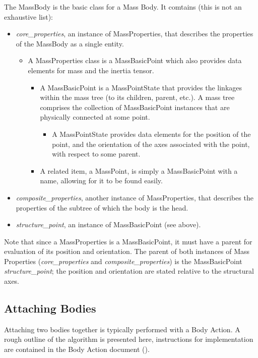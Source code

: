 The MassBody is the basic class for a Mass Body.  It comtains (this is not an 
exhaustive list):
\begin{itemize}
 \item \textit{core\_properties}, an instance of MassProperties, that 
 describes the properties of the MassBody as a single entity.
 \begin{itemize}
  \item A MassProperties class is a MassBasicPoint which also provides data 
  elements for mass and the inertia tensor.
  \begin{itemize}
   \item A MassBasicPoint is a MassPointState that provides the linkages 
   within the mass tree (to its children, parent, etc.).  A mass tree 
   comprises the collection of MassBasicPoint instances that are physically 
   connected at some point.
   \begin{itemize}
    \item A MassPointState provides data elements for the position of the 
    point, and the orientation of the axes associated with the point, with 
    respect to some parent.
   \end{itemize}
   \item A related item, a MassPoint, is simply a MassBasicPoint with a name, 
   allowing for it to be found easily.
  \end{itemize}
  \end{itemize}
 

 \item \textit{composite\_properties}, another instance of MassProperties, 
 that describes the properties of the subtree of which the body is the head.
 \item \textit{structure\_point}, an instance of MassBasicPoint (see above).
\end{itemize}

Note that since a MassProperties is a MassBasicPoint, it must have a parent 
for evaluation of its position and orientation.  The parent of both instances 
of Mass Properties (\textit{core\_properties} and 
\textit{composite\_properties}) is the MassBasicPoint  
\textit{structure\_point}; the position and orientation are stated relative to 
the structural axes.


\subsection{Attaching Bodies}\label{sec:attaching_bodies}
Attaching two bodies together is typically performed with a Body Action.  A 
rough outline of the algorithm is presented here, instructions for 
implementation are contained in the Body Action document 
(\cite{dynenv:DYNBODY}).

